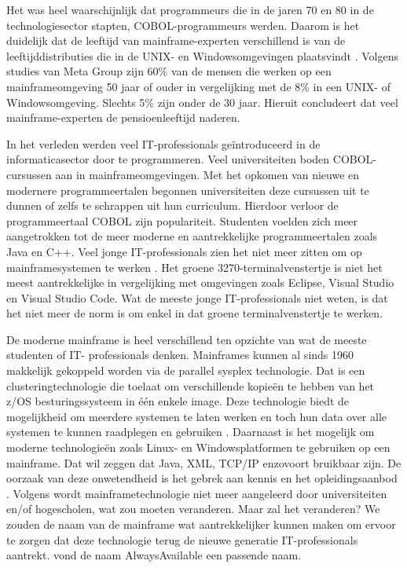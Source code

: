 Het was heel waarschijnlijk dat programmeurs die in de jaren 70 en 80 in de technologiesector stapten, COBOL-programmeurs werden. Daarom is het duidelijk dat de leeftijd van mainframe-experten verschillend is van de leeftijddistributies die in de UNIX- en Windowsomgevingen plaatsvindt \autocite{McGirr2004}. Volgens studies van Meta Group zijn 60\% van de mensen die werken op een mainframeomgeving  50 jaar of ouder in vergelijking met de 8\% in een UNIX- of Windowsomgeving. Slechts 5\% zijn onder de 30 jaar. Hieruit concludeert  \textcite{McGirr2004} dat veel mainframe-experten de pensioenleeftijd naderen. 

In het verleden werden veel IT-professionals geïntroduceerd in de informaticasector door te programmeren. Veel universiteiten boden COBOL-cursussen aan in mainframeomgevingen. Met het opkomen van nieuwe en modernere programmeertalen begonnen universiteiten deze cursussen uit te dunnen of zelfs te schrappen uit hun curriculum. Hierdoor verloor de programmeertaal COBOL zijn populariteit. Studenten voelden zich meer aangetrokken tot de meer moderne en aantrekkelijke programmeertalen zoals Java en C++. Veel jonge IT-professionals zien het niet meer zitten om op mainframesystemen te werken \autocite{Mullins2016}. Het groene 3270-terminalvenstertje is niet het meest aantrekkelijke in vergelijking met omgevingen zoals Eclipse, Visual Studio en Visual Studio Code. Wat de meeste jonge IT-professionals niet weten, is dat het niet meer de norm is om enkel in dat groene terminalvenstertje te werken. 

De moderne mainframe is heel verschillend ten opzichte van wat de meeste studenten of IT- professionals denken. Mainframes kunnen al sinds 1960 makkelijk gekoppeld worden via de parallel sysplex technologie. Dat is een clusteringtechnologie die toelaat om verschillende kopieën te hebben van het z/OS besturingssysteem in één enkele image. Deze technologie biedt de mogelijkheid om meerdere systemen te laten werken en toch hun data over alle systemen te kunnen raadplegen en gebruiken \autocite{Sarkar2020}. Daarnaast is het mogelijk om moderne technologieën zoals Linux- en Windowsplatformen te gebruiken op een mainframe. Dat wil zeggen dat Java, XML, TCP/IP enzovoort bruikbaar zijn. De oorzaak van deze onwetendheid is het gebrek aan kennis en het opleidingsaanbod \autocite{Mullins2016}. Volgens \textcite{Mullins2016} wordt mainframetechnologie niet meer aangeleerd door universiteiten en/of hogescholen, wat zou moeten veranderen. Maar zal het veranderen? We zouden de naam van de mainframe wat aantrekkelijker kunnen maken om ervoor te zorgen dat deze technologie terug de nieuwe generatie IT-professionals aantrekt. \textcite{Mullins2016} vond de naam AlwaysAvailable een passende naam.


